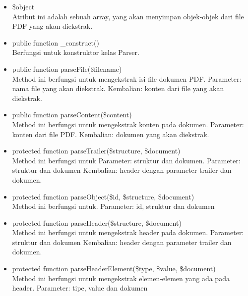 \begin{itemize}
	\item \$object \\
	Atribut ini adalah sebuah array, yang akan menyimpan objek-objek dari file PDF yang akan diekstrak.

	\item public function \_construct() \\
	Berfungsi untuk konstruktor kelas Parser.
	
	\item public function parseFile(\$filename) \\
	Method ini berfungsi untuk mengekstrak isi file dokumen PDF. \newline
	Parameter: nama file yang akan diekstrak. \newline
	Kembalian: konten dari file yang akan diekstrak.
	
	\item public function parseContent(\$content) \\
	Method ini berfungsi untuk mengekstrak konten pada dokumen. \newline
	Parameter: konten dari file PDF. \newline
	Kembalian: dokumen yang akan diekstrak.
	
	\item protected function parseTrailer(\$structure, \$document) \\
	Method ini berfungsi untuk Parameter: struktur dan dokumen. \newline
	Parameter: struktur dan dokumen \newline
	Kembalian: header dengan parameter trailer dan dokumen.
	
	\item protected function parseObject(\$id, \$structure, \$document) \\
	Method ini berfungsi untuk. \newline
	Parameter: id, struktur dan dokumen
	
	\item protected function parseHeader(\$structure, \$document) \\
	Method ini berfungsi untuk mengekstrak header pada dokumen. \newline
	Parameter: struktur dan dokumen \newline	
	Kembalian: header dengan parameter trailer dan dokumen.
	
	\item protected function parseHeaderElement(\$type, \$value, \$document) \\
	Method ini berfungsi untuk mengekstrak elemen-elemen yang ada pada header. \newline
	Parameter: tipe, value dan dokumen
\end{itemize}


